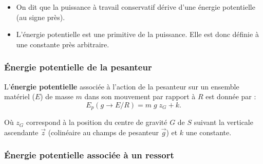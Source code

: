 \documentclass[10pt,fleqn]{article} %
\begin{document}
\begin{rem}%
\begin{itemize}
\item On dit que la puissance à travail conservatif dérive d'une énergie potentielle (au signe près).
\item L'énergie potentielle est une primitive de la puissance. Elle est donc définie à une constante près arbitraire.
\end{itemize}
\end{rem}%
\subsubsection{Énergie potentielle de la pesanteur}



\begin{defi}
L'\textbf{énergie potentielle} associée à l'action de la pesanteur sur un ensemble matériel ($E$) de masse $m$ dans son mouvement par rapport à $R$ est donnée par :
$$
E_p(g \rightarrow E/R)=m\;g\;z_G + k.
$$

Où $z_G$ correspond à la position du centre de gravité $G$ de $S$ suivant la verticale ascendante $\overrightarrow{z}$ (colinéaire au champs de pesanteur $\overrightarrow{g}$) et $k$ une constante.

\end{defi}



\subsubsection{Énergie potentielle associée à un ressort}
\end{document}
